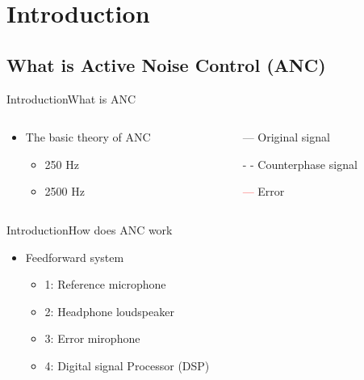 \section{Introduction}
\subsection{What is Active Noise Control (ANC)}
\begin{frame}{Introduction}{What is ANC}		
	\begin{columns}
		\begin{column}{0.5\textwidth}
				\begin{itemize}
					\item The basic theory of ANC
					\begin{itemize}
						\item 250 Hz
						\item 2500 Hz 
					\end{itemize}	
				\end{itemize}
				\vspace{8.5mm}
		\begin{center}
	 		
	 	\end{center}
		\end{column}
		\begin{column}{0.5\textwidth} 
			\begin{itemize}
				\item[\textcolor{MATLABblue}{---}] Original signal
				\item[\textcolor{MATLABblue}{- -}] Counterphase signal
				\item[\textcolor{red}{---}] Error
			\end{itemize}
		\begin{center}
	 		
	 	\end{center}
		\end{column}
	\end{columns}
\end{frame}





\begin{frame}{Introduction}{How does ANC work}		
	\begin{itemize}
		\item Feedforward system
		\begin{itemize}
			\item 1: Reference microphone
			\item 2: Headphone loudspeaker
			\item 3: Error mirophone
			\item 4: Digital signal Processor (DSP)
		\end{itemize}
	\end{itemize}
	\begin{center}
	 	
	\end{center}
\end{frame}





